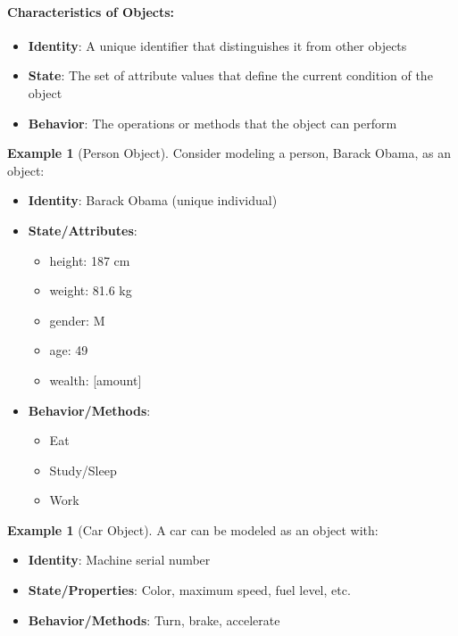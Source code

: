 \documentclass[11pt, a4paper, notitlepage]{report}
\theoremstyle{definition}
\theoremstyle{remark}
\theoremstyle{definition}
\newtheorem{example}[theorem]{Example}
\begin{document}
\paragraph{Characteristics of Objects:}
\begin{itemize}
  \item \textbf{Identity}: A unique identifier that distinguishes it from other objects
  \item \textbf{State}: The set of attribute values that define the current condition of the object
  \item \textbf{Behavior}: The operations or methods that the object can perform
\end{itemize}

\begin{example}[Person Object]
\label{ex:ch1-person}
Consider modeling a person, Barack Obama, as an object:
\begin{itemize}
  \item \textbf{Identity}: Barack Obama (unique individual)
  \item \textbf{State/Attributes}:
    \begin{itemize}
      \item height: 187 cm
      \item weight: 81.6 kg
      \item gender: M
      \item age: 49
      \item wealth: [amount]
    \end{itemize}
  \item \textbf{Behavior/Methods}:
    \begin{itemize}
      \item Eat
      \item Study/Sleep
      \item Work
    \end{itemize}
\end{itemize}
\end{example}

\begin{example}[Car Object]
\label{ex:ch1-car}
A car can be modeled as an object with:
\begin{itemize}
  \item \textbf{Identity}: Machine serial number
  \item \textbf{State/Properties}: Color, maximum speed, fuel level, etc.
  \item \textbf{Behavior/Methods}: Turn, brake, accelerate
\end{itemize}
\end{example}
\end{document}
